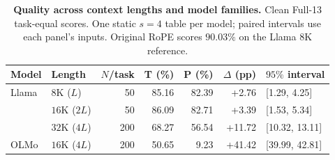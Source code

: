 \begin{table}[ht]
\centering\small
\caption{\textbf{Quality across context lengths and model families.} Clean Full-13 task-equal scores. One static $s=4$ table per model; paired intervals use each panel's inputs. Original RoPE scores $90.03\%$ on the Llama $8$K reference.}
\label{tab:clean-length-main}
\begin{tabular}{@{}llrrrrl@{}}
\toprule
Model & Length & $N$/task & T (\%) & P (\%) & $\Delta$ (pp) & $95\%$ interval \\
\midrule
Llama & $8$K ($L$) & 50 & 85.16 & 82.39 & +2.76 & [1.29, 4.25] \\
 & $16$K ($2L$) & 50 & 86.09 & 82.71 & +3.39 & [1.53, 5.34] \\
 & $32$K ($4L$) & 200 & 68.27 & 56.54 & +11.72 & [10.32, 13.11] \\
OLMo & $16$K ($4L$) & 200 & 50.65 & 9.23 & +41.42 & [39.99, 42.81] \\
\bottomrule
\end{tabular}
\end{table}
